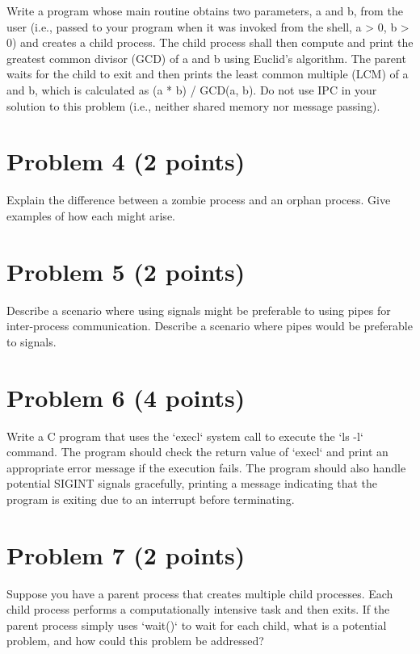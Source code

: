\documentclass{article}
\begin{document}
Write a program whose main routine obtains two parameters, a and b, from the user (i.e., passed to your program when it was invoked from the shell, a > 0, b > 0) and creates a child process. The child process shall then compute and print the greatest common divisor (GCD) of a and b using Euclid's algorithm. The parent waits for the child to exit and then prints the least common multiple (LCM) of a and b, which is calculated as (a * b) / GCD(a, b).  Do not use IPC in your solution to this problem (i.e., neither shared memory nor message passing).


\section*{Problem 4 (2 points)}

Explain the difference between a zombie process and an orphan process.  Give examples of how each might arise.


\section*{Problem 5 (2 points)}

Describe a scenario where using signals might be preferable to using pipes for inter-process communication.  Describe a scenario where pipes would be preferable to signals.


\section*{Problem 6 (4 points)}

Write a C program that uses the `execl` system call to execute the `ls -l` command. The program should check the return value of `execl` and print an appropriate error message if the execution fails.  The program should also handle potential SIGINT signals gracefully, printing a message indicating that the program is exiting due to an interrupt before terminating.


\section*{Problem 7 (2 points)}

Suppose you have a parent process that creates multiple child processes.  Each child process performs a computationally intensive task and then exits.  If the parent process simply uses `wait()` to wait for each child, what is a potential problem, and how could this problem be addressed?
\end{document}
